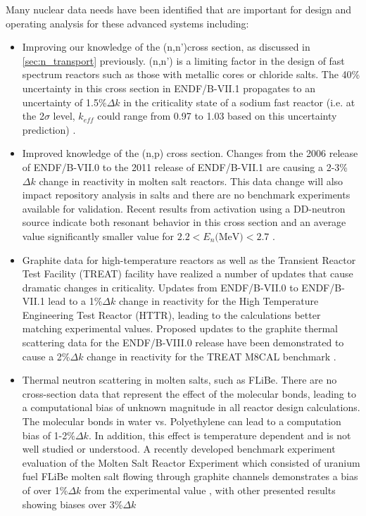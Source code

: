 \documentclass[letterpaper]{ar-1col}
\newcommand{\textred}[1]{\textcolor{red}{ #1}}
\begin{document}
Many nuclear data needs have been identified that are important for design and operating analysis for these advanced systems including:
\begin{itemize}
  \item Improving our knowledge of the (n,n')cross section, as discussed in \autoref{sec:n_transport} previously.
  (n,n') is a limiting factor in the design of fast spectrum reactors such as those with metallic cores or chloride salts.
The 40\% uncertainty in this cross section in ENDF/B-VII.1 propagates to an uncertainty of 1.5\%$\Delta k$ in the criticality state of a sodium fast reactor (i.e. at the 2$\sigma$ level, $k_{eff}$ could range from 0.97 to 1.03 based on this uncertainty prediction) \cite{touran2016sensitivities}.
  \item Improved knowledge of the (n,p) cross section.
 Changes from the 2006 release of ENDF/B-VII.0 to the 2011 release of ENDF/B-VII.1 are causing a 2-3\%$\Delta k$ change in reactivity in molten salt reactors.
This data change will also impact repository analysis in salts and there are no benchmark experiments available for validation.
Recent results from activation using a DD-neutron source \cite{Voyles2017} indicate both resonant behavior in this cross section and an average value significantly smaller value for  $2.2 < E_n \text{(MeV)} < 2.7$ \textred{\cite{Bat18}}.  
  \item Graphite data for high-temperature reactors as well as the Transient Reactor Test Facility (TREAT) facility have realized a number of updates that cause dramatic changes in criticality.
Updates from ENDF/B-VII.0 to ENDF/B-VII.1 lead to a 1\%$\Delta k$ change in reactivity for the High Temperature Engineering Test Reactor (HTTR), leading to the calculations better matching experimental values.
Proposed updates to the graphite thermal scattering data for the ENDF/B-VIII.0 release have been demonstrated to cause a 2\%$\Delta k$ change in reactivity for the TREAT M8CAL benchmark \cite{hawarithermal}.
  \item Thermal neutron scattering in molten salts, such as FLiBe.
There are no cross-section data that represent the effect of the molecular bonds, leading to a computational bias of unknown magnitude in all reactor design calculations.
The molecular bonds in water vs. Polyethylene can lead to a computation bias of 1-2\%$\Delta k$.
 In addition, this effect is temperature dependent and is not well studied or understood.
A recently developed benchmark experiment evaluation of the Molten Salt Reactor Experiment which consisted of uranium fuel FLiBe molten salt flowing through graphite channels demonstrates a bias of over 1\%$\Delta k$ from the experimental value \cite{shenzero}, with other presented results showing biases over 3\%$\Delta k$

\end{itemize}
\end{document}
